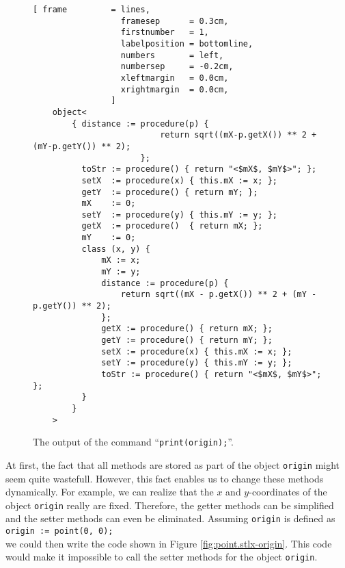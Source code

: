 \begin{figure}[!ht]
\centering
\begin{Verbatim}[ frame         = lines, 
                  framesep      = 0.3cm, 
                  firstnumber   = 1,
                  labelposition = bottomline,
                  numbers       = left,
                  numbersep     = -0.2cm,
                  xleftmargin   = 0.0cm,
                  xrightmargin  = 0.0cm,
                ]
    object<
        { distance := procedure(p) { 
                          return sqrt((mX-p.getX()) ** 2 + (mY-p.getY()) ** 2); 
                      }; 
          toStr := procedure() { return "<$mX$, $mY$>"; }; 
          setX  := procedure(x) { this.mX := x; }; 
          getY  := procedure() { return mY; }; 
          mX    := 0; 
          setY  := procedure(y) { this.mY := y; }; 
          getX  := procedure()  { return mX; }; 
          mY    := 0; 
          class (x, y) { 
              mX := x; 
              mY := y; 
              distance := procedure(p) { 
                  return sqrt((mX - p.getX()) ** 2 + (mY - p.getY()) ** 2); 
              }; 
              getX := procedure() { return mX; };
              getY := procedure() { return mY; }; 
              setX := procedure(x) { this.mX := x; }; 
              setY := procedure(y) { this.mY := y; }; 
              toStr := procedure() { return "<$mX$, $mY$>"; }; 
          } 
        }
    >
\end{Verbatim}
\vspace*{-0.3cm}
\caption{The output of the command ``\texttt{print(origin);}''.}
\label{fig:print_origin}
\end{figure}

At first, the fact that all methods are stored as part of the object \texttt{origin} might seem quite
wastefull.  However, this fact enables us to change these methods dynamically.  For example, we can
realize that the $x$ and $y$-coordinates of the object \texttt{origin} really are fixed.  Therefore,
the getter methods can be 
simplified and the setter methods can even be eliminated.  Assuming \texttt{origin} is defined as
\\[0.2cm]
\hspace*{1.3cm}
\texttt{origin := point(0, 0);}
\\[0.2cm]
we could then write the code shown in Figure \ref{fig:point.stlx-origin}.
This code would make it impossible to call the setter methods for the object \texttt{origin}.


